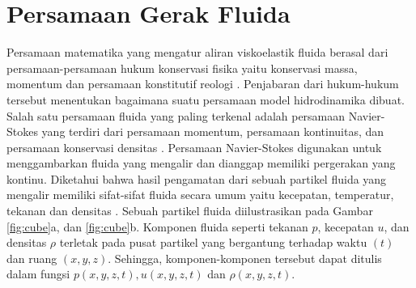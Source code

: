 \section[Persamaan Gerak Fluida]{Persamaan Gerak Fluida}
\begin{spacing}{1.5}
	
	Persamaan matematika yang mengatur aliran viskoelastik fluida berasal dari persamaan-persamaan hukum konservasi fisika yaitu konservasi massa, momentum dan persamaan konstitutif reologi . Penjabaran dari hukum-hukum tersebut menentukan bagaimana suatu persamaan model hidrodinamika dibuat. Salah satu persamaan fluida yang paling terkenal adalah persamaan Navier-Stokes yang terdiri dari persamaan momentum, persamaan kontinuitas, dan persamaan konservasi densitas . Persamaan Navier-Stokes digunakan untuk menggambarkan fluida yang mengalir dan dianggap memiliki pergerakan yang kontinu. Diketahui bahwa hasil pengamatan dari sebuah partikel fluida yang mengalir memiliki sifat-sifat fluida secara umum yaitu kecepatan, temperatur, tekanan dan densitas . Sebuah partikel fluida diilustrasikan pada Gambar \ref{fig:cube}a, dan \ref{fig:cube}b. Komponen fluida seperti tekanan $p$, kecepatan $u$, dan densitas $\rho$ terletak pada pusat partikel yang bergantung terhadap waktu $(t)$ dan ruang $(x,y,z)$. Sehingga, komponen-komponen tersebut dapat ditulis dalam fungsi $p(x,y,z,t), u(x,y,z,t)$  dan $\rho(x,y,z,t)$. 
	

\end{spacing}
